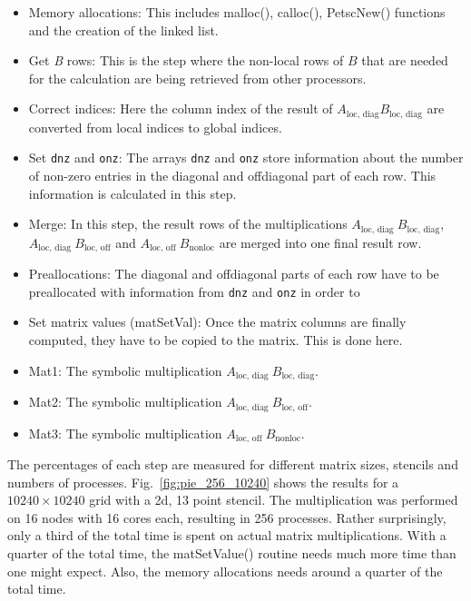 \begin{itemize}
\item Memory allocations: This includes malloc(), calloc(), PetscNew() functions and the creation of the linked list.
\item Get \textit{B} rows: This is the step where the non-local rows of $B$ that are needed for the calculation are being retrieved from other processors.
\item Correct indices: Here the column index of the result of $A_{\textrm{loc, diag}} B_{\textrm{loc, diag}}$ are converted from local indices to global indices.
\item Set \texttt{dnz} and \texttt{onz}: The arrays \texttt{dnz} and \texttt{onz} store information about the number of non-zero entries in the diagonal and offdiagonal part of each row. This information is calculated in this step. 
\item Merge: In this step, the result rows of the multiplications $A_{\textrm{loc, diag~}} B_{\textrm{loc, diag}}$,   \\$A_{\textrm{loc, diag~}} B_{\textrm{loc, off}}$ and $A_{\textrm{loc, off~}} B_{\textrm{nonloc}}$ are merged into one final result row.
\item Preallocations: The diagonal and offdiagonal parts of each row have to be preallocated with information from \texttt{dnz} and \texttt{onz} in order to 
\item Set matrix values (matSetVal): Once the matrix columns are finally computed, they have to be copied to the matrix. This is done here.
\item Mat1: The symbolic multiplication $A_{\textrm{loc, diag~}} B_{\textrm{loc, diag}}$.
\item Mat2: The symbolic multiplication $A_{\textrm{loc, diag~}} B_{\textrm{loc, off}}$.
\item Mat3: The symbolic multiplication $A_{\textrm{loc, off~}} B_{\textrm{nonloc}}$.
\end{itemize}

The percentages of each step are measured for different matrix sizes, stencils and numbers of processes. Fig.~\ref{fig:pie_256_10240} shows the results for a $10240 \times 10240$ grid with a 2d, 13 point stencil. The multiplication was performed on 16 nodes with 16 cores each, resulting in 256 processes. Rather surprisingly, only a third of the total time is spent on actual matrix multiplications. With a quarter of the total time, the matSetValue() routine needs much more time than one might expect. Also, the memory allocations needs around a quarter of the total time. 

